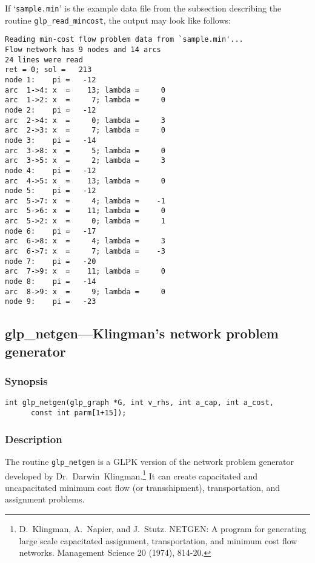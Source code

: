 If `\verb|sample.min|' is the example data file from the subsection
describing the routine \verb|glp_read_mincost|, the output may look like
follows:

\begin{footnotesize}
\begin{verbatim}
Reading min-cost flow problem data from `sample.min'...
Flow network has 9 nodes and 14 arcs
24 lines were read
ret = 0; sol =   213
node 1:    pi =   -12
arc  1->4: x  =    13; lambda =     0
arc  1->2: x  =     7; lambda =     0
node 2:    pi =   -12
arc  2->4: x  =     0; lambda =     3
arc  2->3: x  =     7; lambda =     0
node 3:    pi =   -14
arc  3->8: x  =     5; lambda =     0
arc  3->5: x  =     2; lambda =     3
node 4:    pi =   -12
arc  4->5: x  =    13; lambda =     0
node 5:    pi =   -12
arc  5->7: x  =     4; lambda =    -1
arc  5->6: x  =    11; lambda =     0
arc  5->2: x  =     0; lambda =     1
node 6:    pi =   -17
arc  6->8: x  =     4; lambda =     3
arc  6->7: x  =     7; lambda =    -3
node 7:    pi =   -20
arc  7->9: x  =    11; lambda =     0
node 8:    pi =   -14
arc  8->9: x  =     9; lambda =     0
node 9:    pi =   -23
\end{verbatim}
\end{footnotesize}

\subsection{glp\_netgen---Klingman's network problem generator}

\subsubsection*{Synopsis}

\begin{verbatim}
int glp_netgen(glp_graph *G, int v_rhs, int a_cap, int a_cost,
      const int parm[1+15]);
\end{verbatim}

\subsubsection*{Description}

The routine \verb|glp_netgen| is a GLPK version of the network problem
generator developed by Dr.~Darwin~Klingman.\footnote{D.~Klingman,
A.~Napier, and J.~Stutz. NETGEN: A program for generating large scale
capacitated assignment, transportation, and minimum cost flow networks.
Management Science 20 (1974), 814-20.} It can create capacitated and
uncapacitated minimum cost flow (or transshipment), transportation, and
assignment problems.

